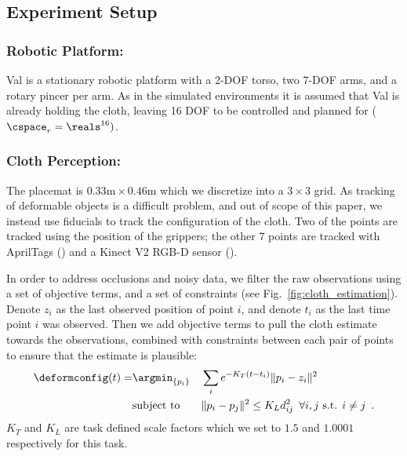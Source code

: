 \subsection{Experiment Setup}

\subsubsection{Robotic Platform:}
Val is a stationary robotic platform with a 2-DOF torso, two 7-DOF arms, and a rotary pincer per arm. As in the simulated environments it is assumed that Val is already holding the cloth, leaving 16 DOF to be controlled and planned for ($\cspace_r = \reals^{16})$.





\subsubsection{Cloth Perception:}
\label{sec:cloth_perception}



The placemat is $0.33\text{m} \times 0.46\text{m}$ which we discretize into a $3 \times 3$ grid. As tracking of deformable objects is a difficult problem, and out of scope of this paper, we instead use fiducials to track the configuration of the cloth. Two of the points are tracked using the position of the grippers; the other 7 points are tracked with AprilTags (\cite{olson2011tags}) and a Kinect V2 RGB-D sensor (\cite{iai_kinect2}).

In order to address occlusions and noisy data, we filter the raw observations using a set of objective terms, and a set of constraints (see Fig.~\ref{fig:cloth_estimation}). Denote $z_i$ as the last observed position of point $i$, and denote $t_i$ as the last time point $i$ was observed. Then we add objective terms to pull the cloth estimate towards the observations, combined with constraints between each pair of points to ensure that the estimate is plausible:
\begin{equation}
\begin{aligned}
    \deformconfig(t) = &\argmin_{\{ p_i \}} 
            & & \sum_i e^{-K_T(t - t_i)} \| p_i - z_i \|^2 \\
            & \text{subject to}
            & & \| p_i - p_j \|^2 \leq K_L d_{ij}^2 \enspace \forall i, j \text{ s.t. } i \neq j \enspace .
\end{aligned}
\label{eqn:cloth_estimation}
\end{equation}
$K_T$ and $K_L$ are task defined scale factors which we set to $1.5$ and $1.0001$ respectively for this task.

